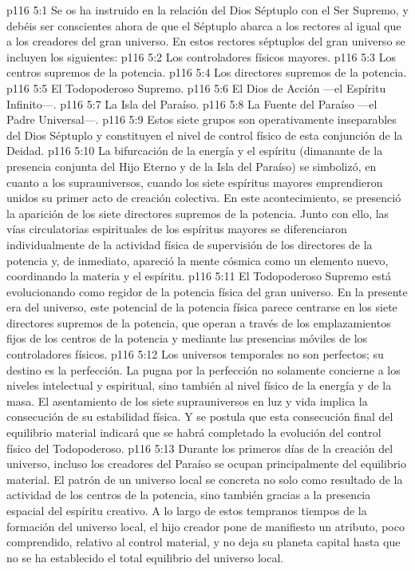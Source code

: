 \vs p116 5:1 Se os ha instruido en la relación del Dios Séptuplo con el Ser Supremo, y debéis ser conscientes ahora de que el Séptuplo abarca a los rectores al igual que a los creadores del gran universo. En estos rectores séptuplos del gran universo se incluyen los siguientes:
\vs p116 5:2 Los controladores físicos mayores.
\vs p116 5:3 Los centros supremos de la potencia.
\vs p116 5:4 Los directores supremos de la potencia.
\vs p116 5:5 El Todopoderoso Supremo.
\vs p116 5:6 El Dios de Acción ---el Espíritu Infinito---.
\vs p116 5:7 La Isla del Paraíso.
\vs p116 5:8 La Fuente del Paraíso ---el Padre Universal---.
\vs p116 5:9 Estos siete grupos son operativamente inseparables del Dios Séptuplo y constituyen el nivel de control físico de esta conjunción de la Deidad.
\vs p116 5:10 \pc La bifurcación de la energía y el espíritu (dimanante de la presencia conjunta del Hijo Eterno y de la Isla del Paraíso) se simbolizó, en cuanto a los suprauniversos, cuando los siete espíritus mayores emprendieron unidos su primer acto de creación colectiva. En este acontecimiento, se presenció la aparición de los siete directores supremos de la potencia. Junto con ello, las vías circulatorias espirituales de los espíritus mayores se diferenciaron individualmente de la actividad física de supervisión de los directores de la potencia y, de inmediato, apareció la mente cósmica como un elemento nuevo, coordinando la materia y el espíritu.
\vs p116 5:11 El Todopoderoso Supremo está evolucionando como regidor de la potencia física del gran universo. En la presente era del universo, este potencial de la potencia física parece centrarse en los siete directores supremos de la potencia, que operan a través de los emplazamientos fijos de los centros de la potencia y mediante las presencias móviles de los controladores físicos.
\vs p116 5:12 \pc Los universos temporales no son perfectos; su destino es la perfección. La pugna por la perfección no solamente concierne a los niveles intelectual y espiritual, sino también al nivel físico de la energía y de la masa. El asentamiento de los siete suprauniversos en luz y vida implica la consecución de su estabilidad física. Y se postula que esta consecución final del equilibrio material indicará que se habrá completado la evolución del control físico del Todopoderoso.
\vs p116 5:13 Durante los primeros días de la creación del universo, incluso los creadores del Paraíso se ocupan principalmente del equilibrio material. El patrón de un universo local se concreta no solo como resultado de la actividad de los centros de la potencia, sino también gracias a la presencia espacial del espíritu creativo. A lo largo de estos tempranos tiempos de la formación del universo local, el hijo creador pone de manifiesto un atributo, poco comprendido, relativo al control material, y no deja su planeta capital hasta que no se ha establecido el total equilibrio del universo local.
